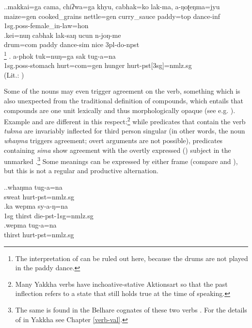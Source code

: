 \ex.\ag.makkai=ga cama, chiʔwa=ga    khyu,   cabhak=ko  lak-ma, a-ŋoʈeŋma=jyu\\
maize{\sc =gen} cooked\_grains nettle{\sc =gen} curry\_sauce paddy{\sc =top} dance{\sc -inf} {\sc 1sg.poss-}female\_in-law{\sc =hon}\\
 
\bg.kei=nuŋ cabhak lak-saŋ ucun n-joŋ-me\\
drum{\sc =com} paddy dance{\sc -sim} nice {\sc 3pl-}do{\sc -npst}\\
\footnote{The interpretation of  can be ruled out here, because the drums are not played in the paddy dance.} 
	\bg. a-phok tuk=nuŋ=ga  sak tug-a=na\\
	{\sc 1sg.poss}-stomach hurt{\sc =com=gen} hunger hurt{\sc -pst[3sg]=nmlz.sg}	\\
	 (Lit.: ) 

	
Some of the nouns may even trigger agreement on the verb, something which is also unexpected from the traditional definition of compounds, which entails that compounds are one unit lexically and thus morphologically opaque  (see e.g. \citealt{Fabb2001Compounding}). Example \Next[a] and \Next[b] are different in this respect:\footnote{Many Yakkha verbs have inchoative-stative Aktionsart so that the past inflection refers to a state that still holds true at the time of speaking.} while predicates that contain the verb \emph{tukma}  are invariably inflected for third person singular (in other words, the noun \emph{whaŋma} triggers agreement; overt arguments are not possible), predicates containing \emph{sima}   show agreement with the overtly expressed () subject in the unmarked  \Next[b].\footnote{The same  is found in the Belhare cognates of these two verbs \citep{Bickel1997The-possessive}. For the details of  in Yakkha see Chapter \ref{verb-val}.} Some meanings can be expressed by either frame (compare \Next[b] and \Next[c]), but this is not a regular and productive alternation.
  
\ex.\ag.whaŋma tug-a=na\\
sweat hurt{\sc [3sg]-pst=nmlz.sg}\\
\bg.ka wepma sy-a-ŋ=na\\
{\sc 1sg} thirst die{\sc -pst-1sg=nmlz.sg}\\
\bg.wepma tug-a=na\\
thirst hurt{\sc [3sg]-pst=nmlz.sg}\\

